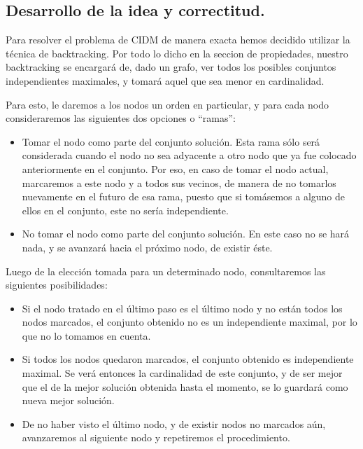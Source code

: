 \subsection{Desarrollo de la idea y correctitud.}

\vspace*{0.3cm}

Para resolver el problema de CIDM de manera exacta hemos decidido utilizar la técnica de backtracking. Por todo lo dicho en la seccion de propiedades, nuestro backtracking se encargará de, dado un grafo, ver todos los posibles conjuntos independientes maximales, y tomará aquel que sea menor en cardinalidad. 

Para esto, le daremos a los nodos un orden en particular, y para cada nodo consideraremos las siguientes dos opciones o ``ramas'':

\begin{itemize}
	\item Tomar el nodo como parte del conjunto solución. Esta rama sólo será considerada cuando el nodo no sea adyacente a otro nodo que ya fue colocado anteriormente en el conjunto.  Por eso, en caso de tomar el nodo actual, marcaremos a este nodo y a todos sus vecinos, de manera de no tomarlos nuevamente en el futuro de esa rama, puesto que si tomásemos a alguno de ellos en el conjunto, este no sería independiente. 
	\item No tomar el nodo como parte del conjunto solución.  En este caso no se hará nada, y se avanzará hacia el próximo nodo, de existir éste.
\end{itemize}

Luego de la elección tomada para un determinado nodo, consultaremos las siguientes posibilidades:

\begin{itemize}
	\item Si el nodo tratado en el último paso es el último nodo y no están todos los nodos marcados, el conjunto obtenido no es un independiente maximal, por lo que no lo tomamos en cuenta.
	\item Si todos los nodos quedaron marcados, el conjunto obtenido es independiente maximal.  Se verá entonces la cardinalidad de este conjunto, y de ser mejor que el de la mejor solución obtenida hasta el momento, se lo guardará como nueva mejor solución.
	\item De no haber visto el último nodo, y de existir nodos no marcados aún, avanzaremos al siguiente nodo y repetiremos el procedimiento.
\end{itemize}

